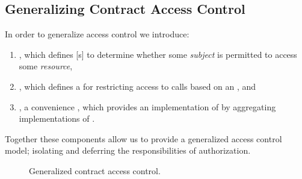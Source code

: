 \subsection{Generalizing Contract Access Control}

In order to generalize  access control we introduce:

\begin{enumerate}
  \item {}, which defines [s] to determine
    whether some \emph{subject} is permitted to access some \emph{resource},
  \item {}, which defines a  for
    restricting access to  calls based on an , and
  \item {}, a convenience , which provides an
    implementation of  by aggregating
    implementations of .
\end{enumerate}

Together these components allow us to provide a generalized access control
model; isolating and deferring the responsibilities of
authorization.%

%

\begin{figure}[H]
  \centering
  \caption{Generalized contract access control.}%
\end{figure}






